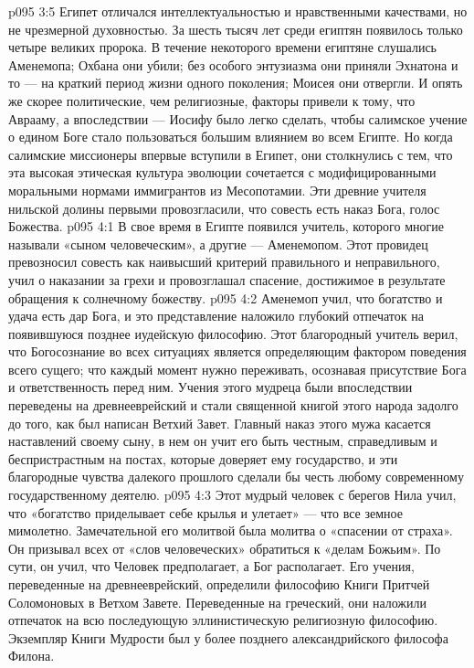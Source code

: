 \vs p095 3:5 \pc Египет отличался интеллектуальностью и нравственными качествами, но не чрезмерной духовностью. За шесть тысяч лет среди египтян появилось только четыре великих пророка. В течение некоторого времени египтяне слушались Аменемопа; Охбана они убили; без особого энтузиазма они приняли Эхнатона и то --- на краткий период жизни одного поколения; Моисея они отвергли. И опять же скорее политические, чем религиозные, факторы привели к тому, что Аврааму, а впоследствии --- Иосифу было легко сделать, чтобы салимское учение о едином Боге стало пользоваться большим влиянием во всем Египте. Но когда салимские миссионеры впервые вступили в Египет, они столкнулись с тем, что эта высокая этическая культура эволюции сочетается с модифицированными моральными нормами иммигрантов из Месопотамии. Эти древние учителя нильской долины первыми провозгласили, что совесть есть наказ Бога, голос Божества.
\vs p095 4:1 В свое время в Египте появился учитель, которого многие называли «сыном человеческим», а другие --- Аменемопом. Этот провидец превозносил совесть как наивысший критерий правильного и неправильного, учил о наказании за грехи и провозглашал спасение, достижимое в результате обращения к солнечному божеству.
\vs p095 4:2 Аменемоп учил, что богатство и удача есть дар Бога, и это представление наложило глубокий отпечаток на появившуюся позднее иудейскую философию. Этот благородный учитель верил, что Богосознание во всех ситуациях является определяющим фактором поведения всего сущего; что каждый момент нужно переживать, осознавая присутствие Бога и ответственность перед ним. Учения этого мудреца были впоследствии переведены на древнееврейский и стали священной книгой этого народа задолго до того, как был написан Ветхий Завет. Главный наказ этого мужа касается наставлений своему сыну, в нем он учит его быть честным, справедливым и беспристрастным на постах, которые доверяет ему государство, и эти благородные чувства далекого прошлого сделали бы честь любому современному государственному деятелю.
\vs p095 4:3 Этот мудрый человек с берегов Нила учил, что «богатство приделывает себе крылья и улетает» --- что все земное мимолетно. Замечательной его молитвой была молитва о «спасении от страха». Он призывал всех от «слов человеческих» обратиться к «делам Божьим». По сути, он учил, что Человек предполагает, а Бог располагает. Его учения, переведенные на древнееврейский, определили философию Книги Притчей Соломоновых в Ветхом Завете. Переведенные на греческий, они наложили отпечаток на всю последующую эллинистическую религиозную философию. Экземпляр Книги Мудрости был у более позднего александрийского философа Филона.
